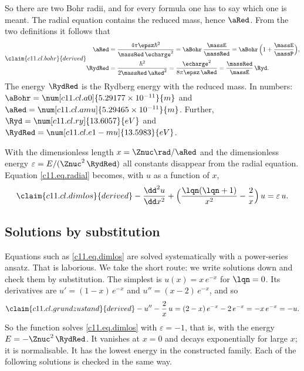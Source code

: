 
So there are two Bohr radii, and for every formula one has to say which one is meant.
The radial equation contains the reduced mass, hence $\aRed$. From the two definitions
it follows that
\begin{equation}\label{c11.eq.bohr}\claim{c11.cl.bohr}{derived}
  \begin{aligned}
    \aRed &= \frac{4\pi\epsz\hbar^2}{\massRed\,\echarge^2}
           = \aBohr\,\frac{\massE}{\massRed}
           = \aBohr\,\Bigl(1 + \frac{\massE}{\massP}\Bigr), \\
    \RydRed &= \frac{\hbar^2}{2\massRed\,\aRed^2}
             = \frac{\echarge^2}{8\pi\epsz\,\aRed}
             = \frac{\massRed}{\massE}\,\Ryd .
  \end{aligned}
\end{equation}
The energy $\RydRed$ is the Rydberg energy with the reduced mass. In numbers:
$\aBohr = \num[c11.cl.a0]{5.29177 \times 10^{-11}}{m}$ and
$\aRed = \num[c11.cl.amu]{5.29465 \times 10^{-11}}{m}$. Further,
$\Ryd = \num[c11.cl.ry]{13.6057}{eV}$ and
$\RydRed = \num[c11.cl.e1-mu]{13.5983}{eV}$.

With the dimensionless length $x = \Znuc\rad/\aRed$ and the dimensionless energy
$\varepsilon = E/(\Znuc^2\,\RydRed)$ all constants disappear from the radial equation.
Equation \eqref{c11.eq.radial} becomes, with $u$ as a function of $x$,
\begin{equation}\label{c11.eq.dimlos}\claim{c11.cl.dimlos}{derived}
  -\frac{\dd^2 u}{\dd x^2} + \Bigl(\frac{\lqn(\lqn + 1)}{x^2} - \frac{2}{x}\Bigr)\,u
  = \varepsilon\,u .
\end{equation}

\subsection{Solutions by substitution}\label{c11.s4.2}

Equations such as \eqref{c11.eq.dimlos} are solved systematically with a power-series
ansatz. That is laborious. We take the short route: we write solutions down and check
them by substitution. The simplest is $u(x) = x\,e^{-x}$ for $\lqn = 0$. Its derivatives
are $u' = (1 - x)\,e^{-x}$ and $u'' = (x - 2)\,e^{-x}$, and so
\begin{equation}\label{c11.eq.grundzustand}\claim{c11.cl.grundzustand}{derived}
  -u'' - \frac{2}{x}\,u = (2 - x)\,e^{-x} - 2\,e^{-x} = -x\,e^{-x} = -u .
\end{equation}
So the function solves \eqref{c11.eq.dimlos} with $\varepsilon = -1$, that is, with the
energy $E = -\Znuc^2\,\RydRed$. It vanishes at $x = 0$ and decays exponentially for large
$x$; it is normalisable. It has the lowest energy in the constructed family. Each of
the following solutions is checked in the same way.

